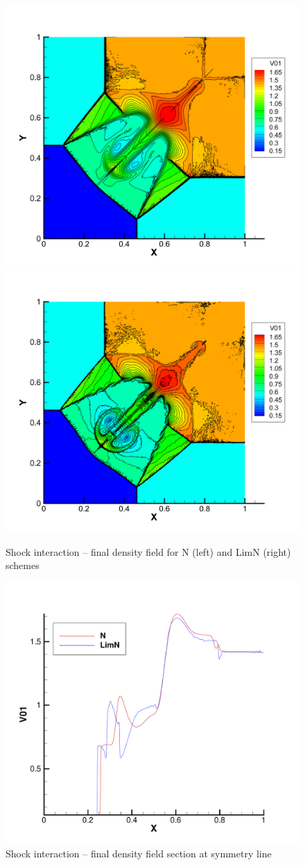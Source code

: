 \documentclass[plainboxedsections, 17pt, b1]{sciposter}
\begin{document}
\begin{multicols}{3}
\begin{figure}%
	\centering
	\includegraphics[width=0.65\columnwidth]{img/euler2shock_n.png} \\
	\includegraphics[width=0.65\columnwidth]{img/euler2shock_limn.png} \\
	\caption{Shock interaction -- final density field for N (left) and LimN (right) schemes}%
\end{figure}
\begin{figure}%
	\centering
	\includegraphics[width=0.65\columnwidth]{img/euler2shock_section.pdf} 
	\caption{Shock interaction -- final density field section at symmetry line}
	\label{}%
\end{figure}




\end{multicols}
\end{document}
